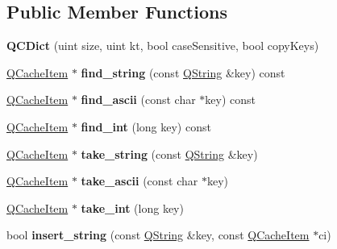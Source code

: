 \subsection*{Public Member Functions}
\begin{DoxyCompactItemize}
\item 
\mbox{\label{class_q_c_dict_a03e70e9f1509c03eb1fd08a8af904734}} 
{\bfseries Q\+C\+Dict} (uint size, uint kt, bool case\+Sensitive, bool copy\+Keys)
\item 
\mbox{\label{class_q_c_dict_a13d6aaa82f057717fdeccf3810971a91}} 
\mbox{\hyperlink{struct_q_cache_item}{Q\+Cache\+Item}} $\ast$ {\bfseries find\+\_\+string} (const \mbox{\hyperlink{class_q_string}{Q\+String}} \&key) const
\item 
\mbox{\label{class_q_c_dict_a8ab97e826d72de0d6cecc9fe24ecdca8}} 
\mbox{\hyperlink{struct_q_cache_item}{Q\+Cache\+Item}} $\ast$ {\bfseries find\+\_\+ascii} (const char $\ast$key) const
\item 
\mbox{\label{class_q_c_dict_aad060d47594d12170058cce6491b1d36}} 
\mbox{\hyperlink{struct_q_cache_item}{Q\+Cache\+Item}} $\ast$ {\bfseries find\+\_\+int} (long key) const
\item 
\mbox{\label{class_q_c_dict_a7f08231ccc7351ca90acf4342e32217a}} 
\mbox{\hyperlink{struct_q_cache_item}{Q\+Cache\+Item}} $\ast$ {\bfseries take\+\_\+string} (const \mbox{\hyperlink{class_q_string}{Q\+String}} \&key)
\item 
\mbox{\label{class_q_c_dict_a1f44b8f805674630a62ccf643cdec5df}} 
\mbox{\hyperlink{struct_q_cache_item}{Q\+Cache\+Item}} $\ast$ {\bfseries take\+\_\+ascii} (const char $\ast$key)
\item 
\mbox{\label{class_q_c_dict_a320567bbbc800a59bdee4f69a356e942}} 
\mbox{\hyperlink{struct_q_cache_item}{Q\+Cache\+Item}} $\ast$ {\bfseries take\+\_\+int} (long key)
\item 
\mbox{\label{class_q_c_dict_ae367e4d033e0f420364584dc64b1371a}} 
bool {\bfseries insert\+\_\+string} (const \mbox{\hyperlink{class_q_string}{Q\+String}} \&key, const \mbox{\hyperlink{struct_q_cache_item}{Q\+Cache\+Item}} $\ast$ci)

\end{DoxyCompactItemize}
